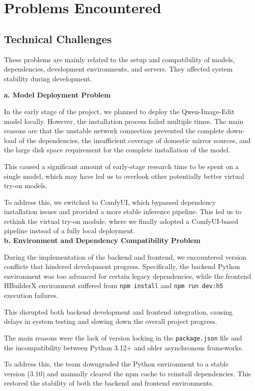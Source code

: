 \section{Problems Encountered}
\subsection{Technical Challenges}
These problems are mainly related to the setup and compatibility of models, dependencies, development environments, and servers. They affected system stability during development.

\textbf{\large a. Model Deployment Problem}  

In the early stage of the project, we planned to deploy the Qwen-Image-Edit model locally. However, the installation process failed multiple times. The main reasons are that the unstable network connection prevented the complete down-
load of the dependencies, the insufficient coverage of domestic mirror sources, and the large disk space requirement for the complete installation of the model.

This caused a significant amount of early-stage research time to be spent on a single model, which may have led us to overlook other potentially better virtual try-on models. 

To address this, we switched to ComfyUI, which bypassed dependency installation issues and provided a more stable inference pipeline. This led us to rethink the virtual try-on module, where we finally adopted a ComfyUI-based pipeline instead of a fully local deployment.\\


\textbf{\large b. Environment and Dependency Compatibility Problem}  

During the implementation of the backend and frontend, we encountered version conflicts that hindered development progress. Specifically, the backend Python environment was too advanced for certain legacy dependencies, while the frontend HBuilderX environment suffered from \texttt{npm install} and \texttt{npm run dev:h5} execution failures.

This disrupted both backend development and frontend integration, causing delays in system testing and slowing down the overall project progress.

The main reasons were the lack of version locking in the \texttt{package.json} file and the incompatibility between Python 3.12+ and older asynchronous frameworks.

To address this, the team downgraded the Python environment to a stable version (3.10) and manually cleared the npm cache to reinstall dependencies. This restored the stability of both the backend and frontend environments.


